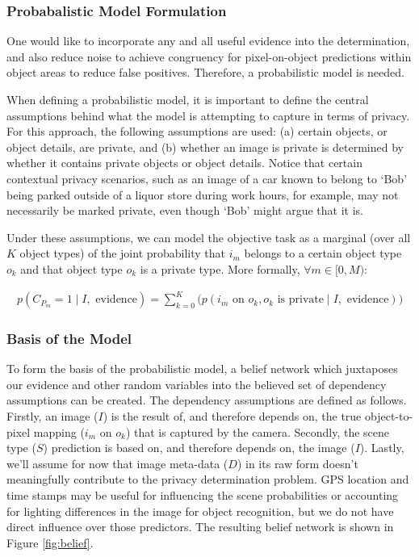 \documentclass[11pt]{article}
\begin{document}
\subsubsection{Probabalistic Model Formulation}

One would like to incorporate any and all useful evidence into the determination, and also reduce noise to achieve congruency for pixel-on-object predictions within object areas to reduce false positives. Therefore, a probabilistic model is needed.

When defining a probabilistic model, it is important to define the central assumptions behind what the model is attempting to capture in terms of privacy. For this approach, the following assumptions are used: (a) certain objects, or object details, are private, and (b) whether an image is private is determined by whether it contains private objects or object details.  Notice that certain contextual privacy scenarios, such as an image of a car known to belong to `Bob' being parked outside of a liquor store during work hours, for example, may not necessarily be marked private, even though `Bob' might argue that it is.

Under these assumptions, we can model the objective task as a marginal (over all $K$ object types) of the joint probability that $i_m$ belongs to a certain object type $o_k$ and that object type $o_k$ is a private type. More formally, $\forall m \in \lbrack0,M)$:

\begin{align}\label{eqn:task1.0}
    p(C_{P_{m}} = 1 \mid I, \textrm{ evidence}) = \sum_{k = 0}^{K} \Big( p(i_m \textrm{ on } o_k, o_k \textrm{ is private} \mid I, \textrm{ evidence}) \Big)
\end{align}



\subsubsection{Basis of the Model}

To form the basis of the probabilistic model, a belief network which juxtaposes our evidence and other random variables into the believed set of dependency assumptions can be created. The dependency assumptions are defined as follows.  Firstly, an image ($I$) is the result of, and therefore depends on, the true object-to-pixel mapping ($i_m$ on $o_k$) that is captured by the camera.  Secondly, the scene type ($S$) prediction is based on, and therefore depends on, the image ($I$).  Lastly, we'll assume for now that image meta-data ($D$) in its raw form doesn't meaningfully contribute to the privacy determination problem.  GPS location and time stamps may be useful for influencing the scene probabilities or accounting for lighting differences in the image for object recognition, but we do not have direct influence over those predictors.  The resulting belief network is shown in Figure \ref{fig:belief}.
\end{document}
